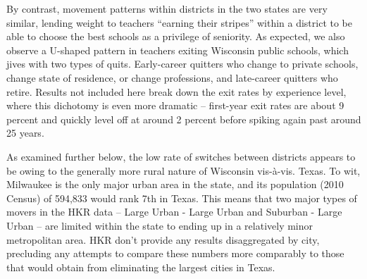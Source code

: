\documentclass[]{article}
\begin{document}
By contrast, movement patterns within districts in the two states are
very similar, lending weight to teachers ``earning their stripes''
within a district to be able to choose the best schools as a privilege
of seniority. As expected, we also observe a U-shaped pattern in
teachers exiting Wisconsin public schools, which jives with two types of
quits. Early-career quitters who change to private schools, change state
of residence, or change professions, and late-career quitters who
retire. Results not included here break down the exit rates by
experience level, where this dichotomy is even more dramatic --
first-year exit rates are about 9 percent and quickly level off at
around 2 percent before spiking again past around 25 years.

As examined further below, the low rate of switches between districts
appears to be owing to the generally more rural nature of Wisconsin
vis-à-vis. Texas. To wit, Milwaukee is the only major urban area in the
state, and its population (2010 Census) of 594,833 would rank 7th in
Texas. This means that two major types of movers in the HKR data --
Large Urban - Large Urban and Suburban - Large Urban -- are limited
within the state to ending up in a relatively minor metropolitan area.
HKR don't provide any results disaggregated by city, precluding any
attempts to compare these numbers more comparably to those that would
obtain from eliminating the largest cities in Texas.
\end{document}
